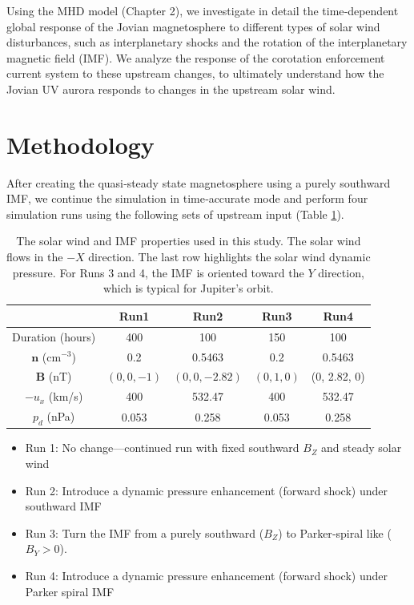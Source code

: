 Using the MHD model (Chapter 2), we investigate in detail the time‐dependent global response of the Jovian magnetosphere to different types of solar wind disturbances, such as interplanetary shocks and the rotation of the interplanetary magnetic field (IMF). We analyze the response of the corotation enforcement current system to these upstream changes, to ultimately understand how the Jovian UV aurora responds to changes in the upstream solar wind.

\section{Methodology}

After creating the quasi‐steady state magnetosphere using a purely southward IMF, we continue the simulation in time‐accurate mode and perform four simulation runs using the following sets of upstream input (Table \ref{tab:sw-conditions}). 

\begin{table}
    \centering
    \begin{tabular}{c|c|c|c|c}
         &Run1  &Run2   &Run3   &Run4  \\
    \hline
    Duration (hours) &400   &100    &150    &100\\
    $\mathbf{n}$ (cm$^{-3}$)    &0.2    &0.5463  &0.2   &0.5463\\
    $\mathbf{B}$ (nT)           &$(0,0,-1)$ &$(0,0,-2.82)$ &$(0, 1, 0)$ &(0, 2.82, 0)\\
    $-u_x$ (km/s)               &400    &532.47     &400    &532.47\\
    $p_d$ (nPa)                 &0.053  &0.258  &0.053  &0.258
    \end{tabular}
    \caption{The solar wind and IMF properties used in this study. The solar wind flows in the $-X$ direction. The last row highlights the solar wind dynamic pressure. For Runs 3 and 4, the IMF is oriented toward the $Y$ direction, which is typical for Jupiter's orbit.}
    \label{tab:sw-conditions}
\end{table}

\begin{itemize}
    \item Run 1: No change—continued run with fixed southward $B_Z$ and steady solar wind
    \item Run 2: Introduce a dynamic pressure enhancement (forward shock) under southward IMF
    \item Run 3: Turn the IMF from a purely southward ($B_Z$) to Parker‐spiral like ($B_Y > 0$).
    \item Run 4: Introduce a dynamic pressure enhancement (forward shock) under Parker spiral IMF
\end{itemize}

